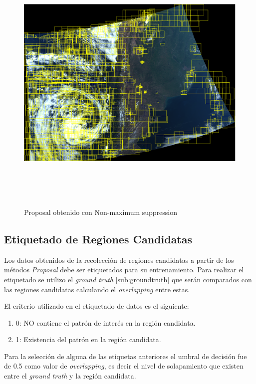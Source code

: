 \begin{figure}[H]
 \centering
  \includegraphics[height=13cm,keepaspectratio=true,clip=true]{imagenes/Logos/proposalconNMS.png}
  \caption{Proposal obtenido con Non-maximum suppression}
	\label{Fig: proposalnms}
\end{figure}


\subsection{Etiquetado de Regiones Candidatas}\label{sub:etiquetado}

Los datos obtenidos de la recolección de regiones candidatas a partir de los métodos \textit{Proposal} debe ser etiquetados para su entrenamiento. Para realizar el etiquetado se utilizo el \textit{ground truth} \ref{sub:groundtruth} que serán comparados con las regiones candidatas calculando el \textit{overlapping} entre estas.

El criterio utilizado en el etiquetado de datos es el siguiente:
\begin{enumerate}
	\item 0: NO contiene el patrón de interés en la región candidata.
	\item 1: Existencia del patrón en la región candidata.
\end{enumerate}

Para la selección de alguna de las etiquetas anteriores el umbral de decisión fue de 0.5 como valor de \textit{overlapping}, es decir el nivel de solapamiento que existen entre el \textit{ground truth} y la región candidata.


